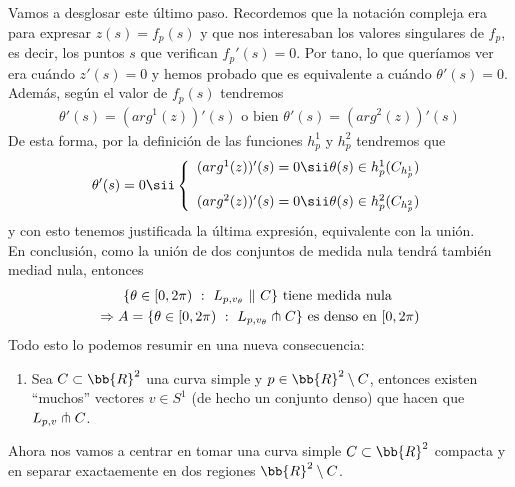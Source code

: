 Vamos a desglosar este último paso. Recordemos que la notación compleja era para expresar $z(s)=f_p(s)$ y que nos interesaban los valores singulares de $f_p$, es decir, los puntos $s$ que verifican $f_p'(s)=0$. Por tano, lo que queríamos ver era cuándo $z'(s)=0$ y hemos probado que es equivalente a cuándo $\theta'(s)=0$. Además, según el valor de $f_p(s)$ tendremos 
\begin{gather*}
    \theta'(s) = (arg^1(z))'(s)  \text{ o bien } \theta'(s) = (arg^2(z))'(s)
\end{gather*}
De esta forma, por la definición de las funciones $h_p^1$ y $h_p^2$ tendremos que 
\begin{gather*}
    \theta'(s) = 0 \sii
    \left\{
        \begin{array}{l}
            (arg^1(z))'(s) = 0 \sii \theta(s)\in h_p^1(C_{h_p^1})\\[1.25em]
            (arg^2(z))'(s) = 0 \sii \theta(s)\in h_p^2(C_{h_p^2})
        \end{array}
    \right.
\end{gather*}
y con esto tenemos justificada la última expresión, equivalente con la unión.\\

En conclusión, como la unión de dos conjuntos de medida nula tendrá también mediad nula, entonces
\begin{gather*}
    \{\theta\in[0,2\pi) \ : \ L_{p,v_\theta} \ \| \ C\} \text{ tiene medida nula } \\
    \Rightarrow A = \{\theta \in [0,2\pi) \ : \ L_{p,v_\theta} \pitchfork C\} \text{ es denso en $[0,2\pi)$}
\end{gather*}
Todo esto lo podemos resumir en una nueva consecuencia:

\begin{enumerate}[start=5]
    \item\label{cons:5} Sea $C \subset \bb{R}^2$ una curva simple y $p\in \bb{R}^2 \setminus C$, entonces existen ``muchos'' vectores $v\in S^1$ (de hecho un conjunto denso) que hacen que $L_{p,v}\pitchfork C$.
\end{enumerate}

Ahora nos vamos a centrar en tomar una curva simple $C\subset \bb{R}^2$ compacta y en separar exactaemente en dos regiones $\bb{R}^2 \setminus C$. \\

